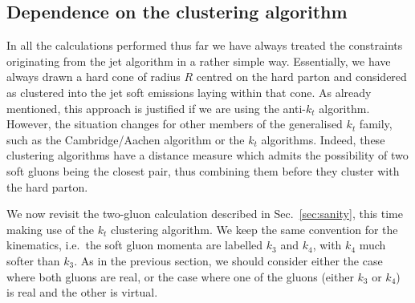 \subsection{Dependence on the clustering algorithm}\label{sec:clustering}

In all the calculations performed thus far we have always treated the constraints originating from the jet algorithm in a rather simple way.
%
Essentially, we have always drawn a hard cone of radius $R$ centred on the hard parton and considered as clustered into the jet soft emissions laying within that cone. 
%
As already mentioned, this approach is justified if we are using the
anti-$k_t$ algorithm.
%
%
However, the situation changes for other members of the generalised $k_t$
family, such as the Cambridge/Aachen algorithm or the $k_t$
algorithms. Indeed, these clustering algorithms have a distance
measure which admits the possibility of two soft gluons being the
closest pair, thus combining them before they cluster with the hard
parton.


We now revisit the two-gluon calculation described in
Sec.~\ref{sec:sanity}, this time making use of the $k_t$ clustering
algorithm. We keep the same convention for the kinematics, i.e.\ the
soft gluon momenta are labelled $k_3$ and $k_4$, with $k_4$ much
softer than $k_3$.
%
As in the previous section, we should consider either the case where
both gluons are real, or the case where one of the gluons (either
$k_3$ or $k_4$) is real and the other is virtual.


